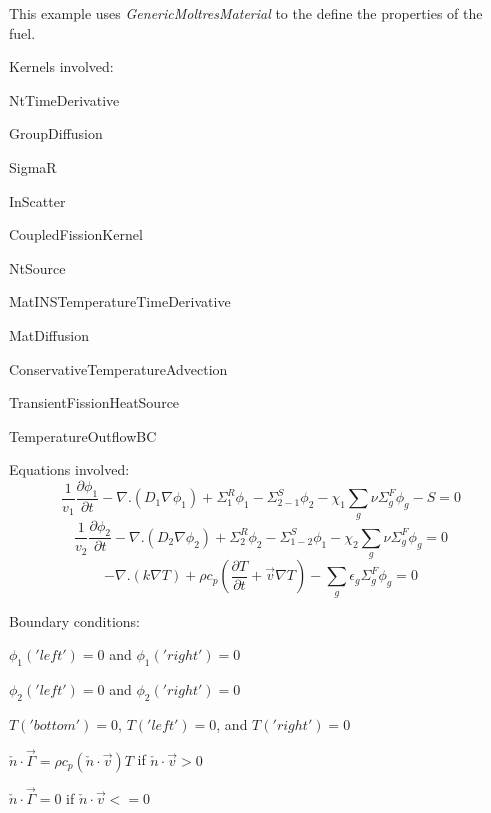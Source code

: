 \documentclass[11pt,letterpaper]{article}
\begin{document}
This example uses \textit{GenericMoltresMaterial} to the define the properties of the fuel.

Kernels involved:
\begin{description}[font=$\bullet$\scshape\bfseries]
    \item[] NtTimeDerivative
	\item[] GroupDiffusion
	\item[]	SigmaR
	\item[] InScatter
	\item[] CoupledFissionKernel
	\item[] NtSource
	\item[] MatINSTemperatureTimeDerivative
	\item[]	MatDiffusion
	\item[] ConservativeTemperatureAdvection
	\item[] TransientFissionHeatSource
    \item[]	TemperatureOutflowBC 
\end{description}

Equations involved:
\begin{equation}
\frac{1}{v_{1}}\frac{\partial \phi_{1}}{\partial t}-\nabla.(D_{1}\nabla\phi_{1})+\Sigma^{R}_{1}\phi_{1}-\Sigma^{S}_{2-1}\phi_{2}-\chi_{1}\sum_{g}\nu\Sigma^{F}_{g}\phi_{g}-S=0
\end{equation}
\begin{equation}
\frac{1}{v_{2}}\frac{\partial \phi_{2}}{\partial t}-\nabla.(D_{2}\nabla\phi_{2})+\Sigma^{R}_{2}\phi_{2}-\Sigma^{S}_{1-2}\phi_{1}-\chi_{2}\sum_{g}\nu\Sigma^{F}_{g}\phi_{g}=0
\end{equation}
\begin{equation}
-\nabla.(k\nabla T)+\rho c_{p} (\frac{\partial T}{\partial t} + \vec{v} \nabla T)-\sum_{g}\epsilon_{g}\Sigma^{F}_{g}\phi_{g}=0
\end{equation}

Boundary conditions:
\begin{description}[]
	\item[] $\phi_{1}('left')=0$ and $\phi_{1}('right')=0$
	\item[] $\phi_{2}('left')=0$ and $\phi_{2}('right')=0$
	\item[] $T('bottom')=0$, $T('left')=0$, and $T('right')=0$
	\item[] $\check{n}\cdot\vec{\Gamma}=\rho c_{p}(\check{n}\cdot\vec{v})T$ if $\check{n}\cdot\vec{v}>0$
	\item[] $\check{n}\cdot\vec{\Gamma}=0$ if $\check{n}\cdot\vec{v}<=0$
\end{description}
\end{document}
